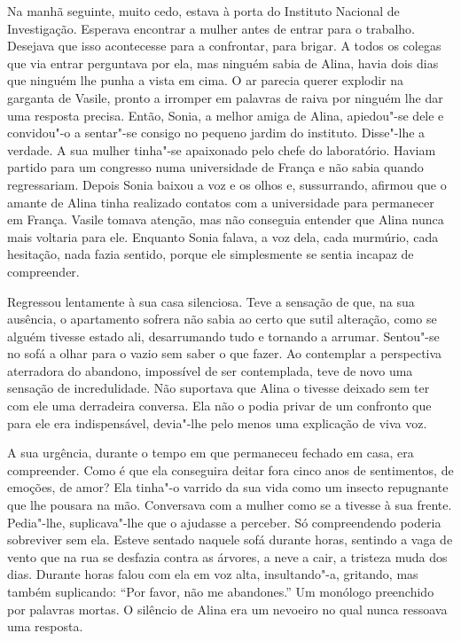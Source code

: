 Na manhã seguinte, muito cedo, estava à porta do Instituto Nacional de
Investigação. Esperava encontrar a mulher antes de entrar para o
trabalho. Desejava que isso acontecesse para a confrontar, para brigar.
A todos os colegas que via entrar perguntava por ela, mas ninguém sabia
de Alina, havia dois dias que ninguém lhe punha a vista em cima. O ar
parecia querer explodir na garganta de Vasile, pronto a irromper em
palavras de raiva por ninguém lhe dar uma resposta precisa. Então,
Sonia, a melhor amiga de Alina, apiedou"-se dele e convidou"-o a sentar"-se
consigo no pequeno jardim do instituto. Disse"-lhe a verdade. A sua
mulher tinha"-se apaixonado pelo chefe do laboratório. Haviam partido
para um congresso numa universidade de França e não sabia quando
regressariam. Depois Sonia baixou a voz e os olhos e, sussurrando, afirmou que o amante de Alina tinha realizado contatos com a universidade
para permanecer em França. Vasile tomava atenção, mas não conseguia
entender que Alina nunca mais voltaria para ele. Enquanto Sonia falava,
a voz dela, cada murmúrio, cada hesitação, nada fazia sentido, porque
ele simplesmente se sentia incapaz de compreender.

Regressou lentamente à sua casa silenciosa. Teve a sensação de que, na sua ausência, o apartamento sofrera não sabia ao certo
que sutil alteração, como se alguém tivesse estado ali, desarrumando
tudo e tornando a arrumar. Sentou"-se no sofá a olhar para o vazio sem
saber o que fazer. Ao contemplar a perspectiva aterradora do abandono,
impossível de ser contemplada, teve de novo uma
sensação de incredulidade. Não suportava que Alina o tivesse deixado sem
ter com ele uma derradeira conversa. Ela não o podia privar de um
confronto que para ele era indispensável, devia"-lhe pelo menos uma
explicação de viva voz.

A sua urgência, durante o tempo em que permaneceu fechado em casa, era
compreender. Como é que ela conseguira deitar fora cinco anos de
sentimentos, de emoções, de amor? Ela tinha"-o varrido da sua vida como
um insecto repugnante que lhe pousara na mão. Conversava com a mulher
como se a tivesse à sua frente. Pedia"-lhe, suplicava"-lhe que o ajudasse a perceber. Só compreendendo poderia sobreviver sem
ela. Esteve sentado naquele sofá durante horas, sentindo a vaga de vento
que na rua se desfazia contra as árvores, a neve a cair, a tristeza muda
dos dias. Durante horas falou com ela em voz alta, insultando"-a,
gritando, mas também suplicando: ``Por favor, não me abandones.'' Um
monólogo preenchido por palavras mortas. O silêncio de Alina era um
nevoeiro no qual nunca ressoava uma resposta.

